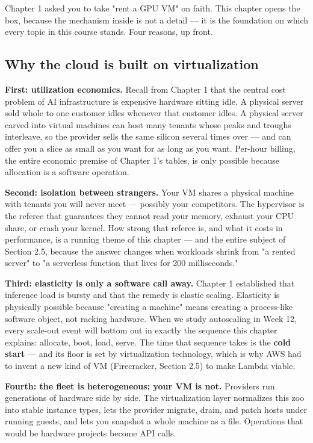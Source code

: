 Chapter 1 asked you to take "rent a GPU VM" on faith. This chapter opens the box, because the mechanism inside is not a detail — it is the foundation on which every topic in this course stands. Four reasons, up front.

\subsection*{Why the cloud is built on virtualization}

\textbf{First: utilization economics.} Recall from Chapter 1 that the central cost problem of AI infrastructure is expensive hardware sitting idle. A physical server sold whole to one customer idles whenever that customer idles. A physical server carved into virtual machines can host many tenants whose peaks and troughs interleave, so the provider sells the same silicon several times over — and can offer you a slice as small as you want for as long as you want. Per-hour billing, the entire economic premise of Chapter 1's tables, is only possible because allocation is a software operation.

\textbf{Second: isolation between strangers.} Your VM shares a physical machine with tenants you will never meet — possibly your competitors. The hypervisor is the referee that guarantees they cannot read your memory, exhaust your CPU share, or crash your kernel. How strong that referee is, and what it costs in performance, is a running theme of this chapter — and the entire subject of Section 2.5, because the answer changes when workloads shrink from "a rented server" to "a serverless function that lives for 200 milliseconds."

\textbf{Third: elasticity is only a software call away.} Chapter 1 established that inference load is bursty and that the remedy is elastic scaling. Elasticity is physically possible because "creating a machine" means creating a process-like software object, not racking hardware. When we study autoscaling in Week 12, every scale-out event will bottom out in exactly the sequence this chapter explains: allocate, boot, load, serve. The time that sequence takes is the \textbf{cold start} — and its floor is set by virtualization technology, which is why AWS had to invent a new kind of VM (Firecracker, Section 2.5) to make Lambda viable.

\textbf{Fourth: the fleet is heterogeneous; your VM is not.} Providers run generations of hardware side by side. The virtualization layer normalizes this zoo into stable instance types, lets the provider migrate, drain, and patch hosts under running guests, and lets you snapshot a whole machine as a file. Operations that would be hardware projects become API calls.

